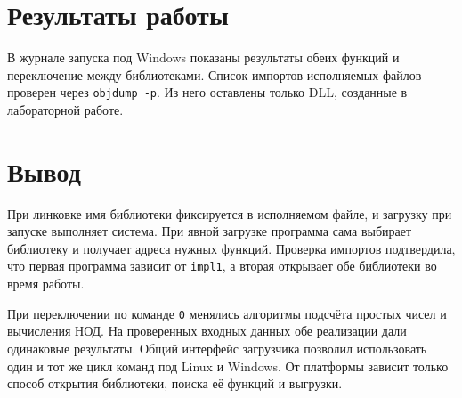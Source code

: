 \clearpage
\section{Результаты работы}

В журнале запуска под Windows показаны результаты обеих функций и переключение
между библиотеками. Список импортов исполняемых файлов проверен через
\texttt{objdump -p}. Из него оставлены только DLL, созданные в лабораторной работе.



\section{Вывод}

При линковке имя библиотеки фиксируется в исполняемом файле, и загрузку при
запуске выполняет система. При явной загрузке программа сама выбирает
библиотеку и получает адреса нужных функций. Проверка импортов подтвердила,
что первая программа зависит от \texttt{impl1}, а вторая открывает обе
библиотеки во время работы.

При переключении по команде \texttt{0} менялись алгоритмы подсчёта простых
чисел и вычисления НОД. На проверенных входных данных обе реализации дали
одинаковые результаты. Общий интерфейс загрузчика позволил использовать
один и тот же цикл команд под Linux и Windows. От платформы зависит только
способ открытия библиотеки, поиска её функций и выгрузки.
